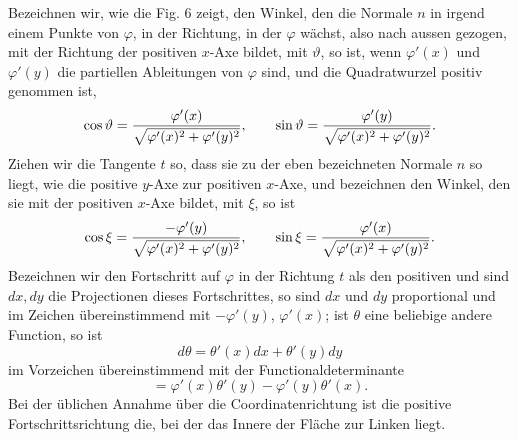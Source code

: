 \documentclass[11pt]{article}
\begin{document}
Bezeichnen wir, wie die Fig. 6 zeigt, den Winkel, den die Normale $n$ in irgend einem Punkte von $\varphi$, in der Richtung, in der $\varphi$ wächst, also nach aussen gezogen, mit der Richtung der positiven $x$-Axe bildet, mit $\vartheta$, so ist, wenn $\varphi'(x)$ und $\varphi'(y)$ die partiellen Ableitungen von $\varphi$ sind, und die Quadratwurzel positiv genommen ist,
\[
\cos\vartheta={\varphi'(x)\over\sqrt{\varphi'(x)^2+\varphi'(y)^2}},
\qquad
\sin\vartheta={\varphi'(y)\over\sqrt{\varphi'(x)^2+\varphi'(y)^2}}.
\]
Ziehen wir die Tangente $t$ so, dass sie zu der eben bezeichneten Normale $n$ so liegt, wie die positive $y$-Axe zur positiven $x$-Axe, und bezeichnen den Winkel, den sie mit der positiven $x$-Axe bildet, mit $\xi$, so ist
\[
\cos\xi={-\varphi'(y)\over\sqrt{\varphi'(x)^2+\varphi'(y)^2}},
\qquad
\sin\xi={\varphi'(x)\over\sqrt{\varphi'(x)^2+\varphi'(y)^2}}.
\]
Bezeichnen wir den Fortschritt auf $\varphi$ in der Richtung $t$ als den positiven und sind $dx,dy$ die Projectionen dieses Fortschrittes, so sind $dx$ und $dy$ proportional und im Zeichen übereinstimmend mit $-\varphi'(y)$, $\varphi'(x)$; ist $\theta$ eine beliebige andere Function, so ist
\[
        d\theta=\theta'(x)dx+\theta'(y)dy
\]
im Vorzeichen übereinstimmend mit der Functionaldeterminante
\begin{equation}
        [\varphi,\theta]=\varphi'(x)\theta'(y)-\varphi'(y)\theta'(x).
\tag{2}
\end{equation}
Bei der üblichen Annahme über die Coordinatenrichtung ist die positive Fortschrittsrichtung die, bei der das Innere der Fläche zur Linken liegt.
\end{document}

